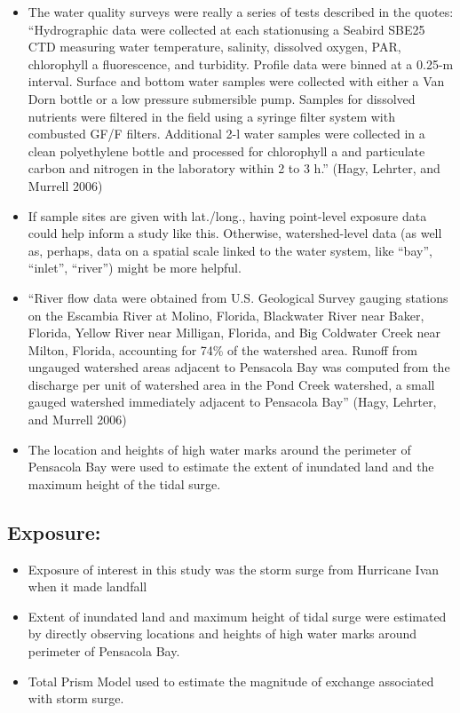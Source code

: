 \documentclass[
]{article}
\providecommand{\tightlist}{%
  \setlength{\itemsep}{0pt}\setlength{\parskip}{0pt}}
\begin{document}
\begin{itemize}
\tightlist
\item
  The water quality surveys were really a series of tests described in
  the quotes: ``Hydrographic data were collected at each stationusing a
  Seabird SBE25 CTD measuring water temperature, salinity, dissolved
  oxygen, PAR, chlorophyll a fluorescence, and turbidity. Profile data
  were binned at a 0.25-m interval. Surface and bottom water samples
  were collected with either a Van Dorn bottle or a low pressure
  submersible pump. Samples for dissolved nutrients were filtered in the
  field using a syringe filter system with combusted GF/F filters.
  Additional 2-l water samples were collected in a clean polyethylene
  bottle and processed for chlorophyll a and particulate carbon and
  nitrogen in the laboratory within 2 to 3 h.'' (Hagy, Lehrter, and
  Murrell 2006)
\item
  If sample sites are given with lat./long., having point-level exposure
  data could help inform a study like this. Otherwise, watershed-level
  data (as well as, perhaps, data on a spatial scale linked to the water
  system, like ``bay'', ``inlet'', ``river'') might be more helpful.
\item
  ``River flow data were obtained from U.S. Geological Survey gauging
  stations on the Escambia River at Molino, Florida, Blackwater River
  near Baker, Florida, Yellow River near Milligan, Florida, and Big
  Coldwater Creek near Milton, Florida, accounting for 74\% of the
  watershed area. Runoff from ungauged watershed areas adjacent to
  Pensacola Bay was computed from the discharge per unit of watershed
  area in the Pond Creek watershed, a small gauged watershed immediately
  adjacent to Pensacola Bay'' (Hagy, Lehrter, and Murrell 2006)
\item
  The location and heights of high water marks around the perimeter of
  Pensacola Bay were used to estimate the extent of inundated land and
  the maximum height of the tidal surge.
\end{itemize}

\hypertarget{exposure-2}{%
\subsection{Exposure:}\label{exposure-2}}

\begin{itemize}
\tightlist
\item
  Exposure of interest in this study was the storm surge from Hurricane
  Ivan when it made landfall
\item
  Extent of inundated land and maximum height of tidal surge were
  estimated by directly observing locations and heights of high water
  marks around perimeter of Pensacola Bay.
\item
  Total Prism Model used to estimate the magnitude of exchange
  associated with storm surge.
\end{itemize}
\end{document}
